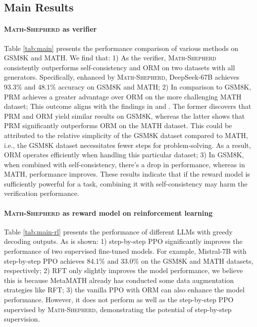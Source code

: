\subsection{Main Results}
\paragraph{\textsc{Math-Shepherd} as verifier} Table \ref{tab:main} presents the performance comparison of various methods on GSM8K and MATH. We find that: 1) As the verifier, \textsc{Math-Shepherd} consistently outperforms self-consistency and ORM on two datasets with all generators. Specifically, enhanced by \textsc{Math-Shepherd}, DeepSeek-67B achieves 93.3\% and 48.1\% accuracy on GSM8K and MATH; 2) In comparison to GSM8K, PRM achieves a greater advantage over ORM on the more challenging MATH dataset; This outcome aligns with the findings in \cite{uesato2022solving} and \cite{lightman2023let}. The former discovers that PRM and ORM yield similar results on GSM8K, whereas the latter shows that PRM significantly outperforms ORM on the MATH dataset. This could be attributed to the relative simplicity of the GSM8K dataset compared to MATH, i.e., the GSM8K dataset necessitates fewer steps for problem-solving. As a result, ORM operates efficiently when handling this particular dataset; 3) In GSM8K, when combined with self-consistency, there's a drop in performance, whereas in MATH, performance improves. These results indicate that if the reward model is sufficiently powerful for a task, combining it with self-consistency may harm the verification performance.

\paragraph{\textsc{Math-Shepherd} as reward model on reinforcement learning} Table \ref{tab:main-rl} presents the performance of different LLMs with greedy decoding outputs. As is shown: 1) step-by-step PPO significantly improves the performance of two supervised fine-tuned models. For example, Mistral-7B with step-by-step PPO achieves 84.1\% and 33.0\% on the GSM8K and MATH datasets, respectively; 2) RFT only slightly improves the model performance, we believe this is because MetaMATH already has conducted some data augmentation strategies like RFT; 3) the vanilla PPO with ORM  can also enhance the model performance. However, it does not perform as well as the step-by-step PPO supervised by \textsc{Math-Shepherd}, demonstrating the potential of step-by-step supervision.

